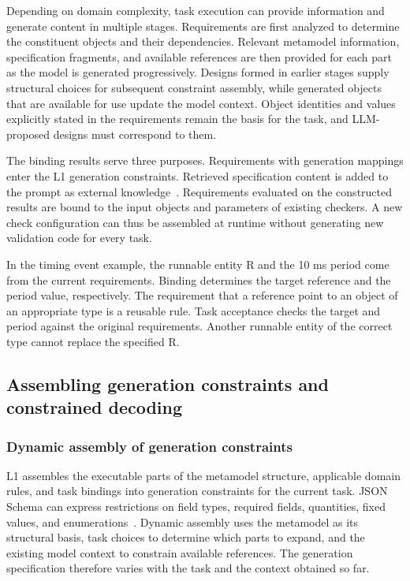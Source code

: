 \documentclass[pdflatex,iicol,sn-mathphys-num]{sn-jnl}
\newcommand{\paperref}[1]{~\citep{#1}}
\begin{document}
Depending on domain complexity, task execution can provide information and generate content in multiple stages. Requirements are first analyzed to determine the constituent objects and their dependencies. Relevant metamodel information, specification fragments, and available references are then provided for each part as the model is generated progressively. Designs formed in earlier stages supply structural choices for subsequent constraint assembly, while generated objects that are available for use update the model context. Object identities and values explicitly stated in the requirements remain the basis for the task, and LLM-proposed designs must correspond to them.


The binding results serve three purposes. Requirements with generation mappings enter the L1 generation constraints. Retrieved specification content is added to the prompt as external knowledge\paperref{NEURIPS2020_6b493230}. Requirements evaluated on the constructed results are bound to the input objects and parameters of existing checkers. A new check configuration can thus be assembled at runtime without generating new validation code for every task.


In the timing event example, the runnable entity R and the 10 ms period come from the current requirements. Binding determines the target reference and the period value, respectively. The requirement that a reference point to an object of an appropriate type is a reusable rule. Task acceptance checks the target and period against the original requirements. Another runnable entity of the correct type cannot replace the specified R.


\subsection{Assembling generation constraints and constrained decoding}\label{sec:method-3-5}

\subsubsection{Dynamic assembly of generation constraints}\label{sec:method-3-5-1}

L1 assembles the executable parts of the metamodel structure, applicable domain rules, and task bindings into generation constraints for the current task. JSON Schema can express restrictions on field types, required fields, quantities, fixed values, and enumerations\paperref{bhutton-json-schema-validation-01}. Dynamic assembly uses the metamodel as its structural basis, task choices to determine which parts to expand, and the existing model context to constrain available references. The generation specification therefore varies with the task and the context obtained so far.
\end{document}
